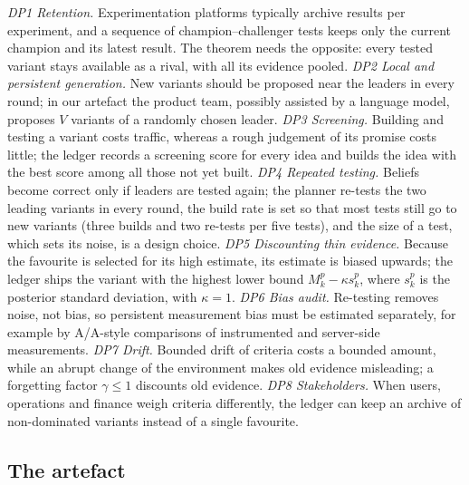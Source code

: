 \documentclass[preprint,12pt,authoryear]{elsarticle}
\theoremstyle{definition}
\begin{document}
\emph{DP1 Retention.} Experimentation platforms typically archive results per experiment, and a sequence of champion--challenger tests keeps only the current champion and its latest result. The theorem needs the opposite: every tested variant stays available as a rival, with all its evidence pooled. \emph{DP2 Local and persistent generation.} New variants should be proposed near the leaders in every round; in our artefact the product team, possibly assisted by a language model, proposes $V$ variants of a randomly chosen leader. \emph{DP3 Screening.} Building and testing a variant costs traffic, whereas a rough judgement of its promise costs little; the ledger records a screening score for every idea and builds the idea with the best score among all those not yet built. \emph{DP4 Repeated testing.} Beliefs become correct only if leaders are tested again; the planner re-tests the two leading variants in every round, the build rate is set so that most tests still go to new variants (three builds and two re-tests per five tests), and the size of a test, which sets its noise, is a design choice. \emph{DP5 Discounting thin evidence.} Because the favourite is selected for its high estimate, its estimate is biased upwards; the ledger ships the variant with the highest lower bound $M^p_k-\kappa s^p_k$, where $s^p_k$ is the posterior standard deviation, with $\kappa=1$. \emph{DP6 Bias audit.} Re-testing removes noise, not bias, so persistent measurement bias must be estimated separately, for example by A/A-style comparisons of instrumented and server-side measurements. \emph{DP7 Drift.} Bounded drift of criteria costs a bounded amount, while an abrupt change of the environment makes old evidence misleading; a forgetting factor $\gamma\le1$ discounts old evidence. \emph{DP8 Stakeholders.} When users, operations and finance weigh criteria differently, the ledger can keep an archive of non-dominated variants instead of a single favourite.

\subsection{The artefact}
\end{document}
